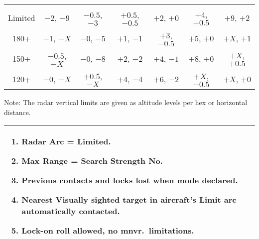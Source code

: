 \begin{twocolumntablefloat}
\begin{twocolumntable}
\begin{tabularx}{0.8\linewidth}{c*{6}{C}}
\toprule
{}&
&
&
&
&
&
\\
\\
\midrule
Limited&$-2$, $-9$&$-0.5$, $-3$&$+0.5$, $-0.5$&$+2$, $+0$&$+4$, $+0.5$&$+9$, $+2$\\
180+&$-1$, $-X$&$-0$, $-5$&$+1$, $-1$&$+3$, $-0.5$&$+5$, $+0$&$+X$, $+1$\\
150+&$-0.5$, $-X$&$-0$, $-8$&$+2$, $-2$&$+4$, $-1$&$+8$, $+0$&$+X$, $+0.5$\\
120+&$-0$, $-X$&$+0.5$, $-X$&$+4$, $-4$&$+6$, $-2$&$+X$, $-0.5$&$+X$, $+0$\\
\bottomrule
\end{tabularx}
\begin{tablenote}{0.8\linewidth}
Note: The radar vertical limits are given as altitude levels per hex or horizontal distance. 
\end{tablenote}

\end{twocolumntable}
\end{twocolumntablefloat}


\begin{onecolumntablefloat}
\begin{onecolumntable}
\begin{tabularx}{\linewidth}{X}
\toprule
\begin{enumerate}
    \item Radar Arc = Limited.
    \item Max Range = Search Strength No.
    \item Previous contacts and locks lost when mode declared.
    \item Nearest Visually sighted target in aircraft's Limit arc automatically contacted.
    \item Lock-on roll allowed, no mnvr.\ limitations.
\end{enumerate}
\\
\bottomrule
\end{tabularx}
\end{onecolumntable}
\end{onecolumntablefloat}


